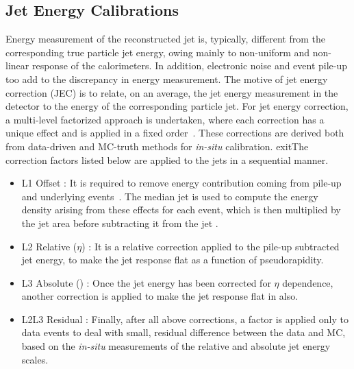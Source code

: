 \subsection{Jet Energy Calibrations}\label{Se:Jec}
Energy measurement of the reconstructed jet is, typically, different from the corresponding true particle jet energy, owing mainly to non-uniform and 
non-linear response of the calorimeters. In addition, electronic noise and event pile-up too add to the discrepancy in energy measurement. The 
motive of jet energy correction (JEC) is to relate, on an average, the jet energy measurement in the detector to the energy of the corresponding 
particle jet. For jet energy correction, a multi-level factorized approach is undertaken, where each correction has a unique effect and is applied 
in a fixed order~\cite{CMS-PAS-JME-07-002}. These corrections are derived both from data-driven and MC-truth methods for \emph{in-situ} calibration. 
exitThe correction factors listed below are applied to the jets in a sequential manner. 
\begin{itemize}
\item L1 Offset : It is required to remove energy contribution coming from pile-up and underlying events~\cite{Cacciari:2007fd}. 
The median jet \pt is used to compute the energy density arising from these effects for each event, which is then multiplied by 
the jet area before subtracting it from the jet \pt.
\item L2 Relative ($\eta$) : It is a relative correction applied to the pile-up subtracted jet energy, to make the jet response flat
as a function of pseudorapidity.
\item L3 Absolute (\pt) : Once the jet energy has been corrected for $\eta$ dependence, another correction is applied to make the 
jet response flat in \pt also.
\item L2L3 Residual : Finally, after all above corrections, a factor is applied only to data events to deal with small,
residual difference between the data and MC, based on the \emph{in-situ} measurements of the relative and absolute jet energy scales.
\end{itemize}


